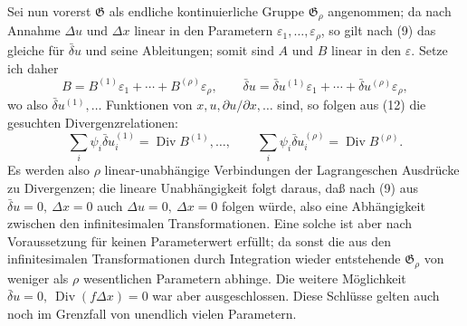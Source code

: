\documentclass[11pt]{article}
\newcommand{\Div}{\operatorname{Div}}
\newcommand{\G}{\mathfrak G}
\newcommand{\D}{\Delta}
\newcommand{\bd}{\bar{\delta}}
\newcommand{\eps}{\varepsilon}
\newcommand{\p}{\partial}
\begin{document}
Sei nun vorerst \(\G\) als endliche kontinuierliche Gruppe \(\G_\rho\) angenommen; da nach Annahme \(\D u\) und \(\D x\) linear in den Parametern \(\eps_1,\ldots,\eps_\rho\), so gilt nach (9) das gleiche für \(\bd u\) und seine Ableitungen; somit sind \(A\) und \(B\) linear in den \(\eps\). Setze ich daher
\[
B=B^{(1)}\eps_1+\cdots+B^{(\rho)}\eps_\rho,\qquad
\bd u=\bd u^{(1)}\eps_1+\cdots+\bd u^{(\rho)}\eps_\rho,
\]
wo also \(\bd u^{(1)},\ldots\) Funktionen von \(x,u,\p u/\p x,\ldots\) sind, so folgen aus (12) die gesuchten Divergenzrelationen:
\begin{equation}
\sum_i\psi_i\bd u_i^{(1)}=\Div B^{(1)},\ldots,\qquad
\sum_i\psi_i\bd u_i^{(\rho)}=\Div B^{(\rho)}.
\tag{13}
\end{equation}
Es werden also \(\rho\) linear-unabhängige Verbindungen der Lagrangeschen Ausdrücke zu Divergenzen; die lineare Unabhängigkeit folgt daraus, daß nach (9) aus \(\bd u=0,\ \D x=0\) auch \(\D u=0,\ \D x=0\) folgen würde, also eine Abhängigkeit zwischen den infinitesimalen Transformationen. Eine solche ist aber nach Voraussetzung für keinen Parameterwert erfüllt; da sonst die aus den infinitesimalen Transformationen durch Integration wieder entstehende \(\G_\rho\) von weniger als \(\rho\) wesentlichen Parametern abhinge. Die weitere Möglichkeit \(\bd u=0,\ \Div(f\D x)=0\) war aber ausgeschlossen. Diese Schlüsse gelten auch noch im Grenzfall von unendlich vielen Parametern.
\end{document}
